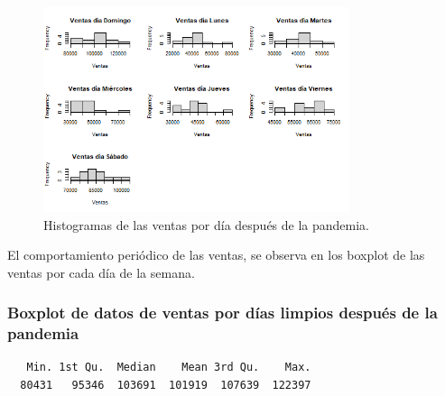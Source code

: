 \documentclass[
  us-letterpaper,
]{scrreprt}
\newenvironment{Shaded}{\begin{snugshade}}{\end{snugshade}}
\newcommand{\FunctionTok}[1]{\textcolor[rgb]{0.28,0.35,0.67}{#1}}
\newcommand{\NormalTok}[1]{\textcolor[rgb]{0.00,0.23,0.31}{#1}}
\newcommand{\SpecialCharTok}[1]{\textcolor[rgb]{0.37,0.37,0.37}{#1}}
\theoremstyle{plain}
\theoremstyle{plain}
\theoremstyle{definition}
\theoremstyle{remark}
\begin{document}
\begin{figure}[H]

{\centering \includegraphics[width=0.8\textwidth,height=\textheight]{his_2.png}

}

\caption{Histogramas de las ventas por día después de la pandemia.}

\end{figure}%

El comportamiento periódico de las ventas, se observa en los boxplot de
las ventas por cada día de la semana.

\subsubsection{Boxplot de datos de ventas por días limpios después de la
pandemia}\label{boxplot-de-datos-de-ventas-por-duxedas-limpios-despuuxe9s-de-la-pandemia}

\begin{Shaded}
\end{Shaded}

\begin{verbatim}
   Min. 1st Qu.  Median    Mean 3rd Qu.    Max. 
  80431   95346  103691  101919  107639  122397 
\end{verbatim}

\begin{Shaded}
\end{Shaded}
\end{document}
